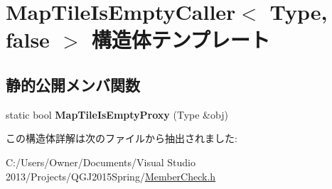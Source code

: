 \hypertarget{struct_map_tile_is_empty_caller_3_01_type_00_01false_01_4}{}\section{Map\+Tile\+Is\+Empty\+Caller$<$ Type, false $>$ 構造体テンプレート}
\label{struct_map_tile_is_empty_caller_3_01_type_00_01false_01_4}
\subsection*{静的公開メンバ関数}
\begin{DoxyCompactItemize}
\item 
static bool {\bfseries Map\+Tile\+Is\+Empty\+Proxy} (Type \&obj)\hypertarget{struct_map_tile_is_empty_caller_3_01_type_00_01false_01_4_af449612a5f725d617603a0edb0f7e6fb}{}\label{struct_map_tile_is_empty_caller_3_01_type_00_01false_01_4_af449612a5f725d617603a0edb0f7e6fb}

\end{DoxyCompactItemize}


この構造体詳解は次のファイルから抽出されました\+:\begin{DoxyCompactItemize}
\item 
C\+:/\+Users/\+Owner/\+Documents/\+Visual Studio 2013/\+Projects/\+Q\+G\+J2015\+Spring/\hyperlink{_member_check_8h}{Member\+Check.\+h}\end{DoxyCompactItemize}
